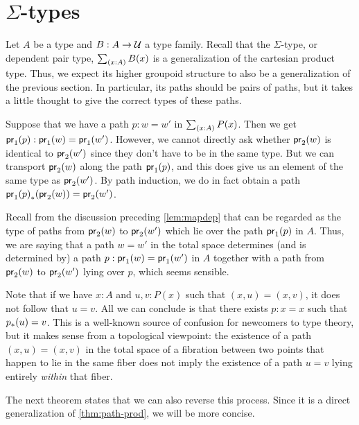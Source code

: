 %

\section{\texorpdfstring{$\Sigma$}{Σ}-types}
\label{sec:compute-sigma}

%
Let $A$ be a type and $B:A\to\mathcal{U}$ a type family.
Recall that the $\Sigma$-type, or dependent pair type, $\sm{x:A} B(x)$ is a generalization of the cartesian product type.
Thus, we expect its higher groupoid structure to also be a generalization of the previous section.
In particular, its paths should be pairs of paths, but it takes a little thought to give the correct types of these paths.

Suppose that we have a path $p:w=w'$ in $\sm{x:A}P(x)$.
Then we get ${\mathsf{pr}_{1}}\mathopen{}\left({p}\right)\mathclose{}:\mathsf{pr}_{1}(w)=\mathsf{pr}_{1}(w')$.
However, we cannot directly ask whether $\mathsf{pr}_{2}(w)$ is identical to $\mathsf{pr}_{2}(w')$ since they don't have to be in the same type.
But we can transport $\mathsf{pr}_{2}(w)$ along the path ${\mathsf{pr}_{1}}\mathopen{}\left({p}\right)\mathclose{}$, and this does give us an element of the same type as $\mathsf{pr}_{2}(w')$.
By path induction, we do in fact obtain a path ${{\mathsf{pr}_{1}}\mathopen{}\left({p}\right)\mathclose{}}_{*}\mathopen{}\left({\mathsf{pr}_{2}(w)}\right)\mathclose{}=\mathsf{pr}_{2}(w')$.

Recall from the discussion preceding \autoref{lem:mapdep} that
can be regarded as the type of paths from $\mathsf{pr}_{2}(w)$ to $\mathsf{pr}_{2}(w')$ which lie over the path ${\mathsf{pr}_{1}}\mathopen{}\left({p}\right)\mathclose{}$ in $A$.
%
%
Thus, we are saying that a path $w=w'$ in the total space determines (and is determined by) a path $p:\mathsf{pr}_{1}(w)=\mathsf{pr}_{1}(w')$ in $A$ together with a path from $\mathsf{pr}_{2}(w)$ to $\mathsf{pr}_{2}(w')$ lying over $p$, which seems sensible.

\begin{rmk}
  Note that if we have $x:A$ and $u,v:P(x)$ such that $(x,u)=(x,v)$, it does not follow that $u=v$.
  All we can conclude is that there exists $p:x=x$ such that ${p}_{*}\mathopen{}\left({u}\right)\mathclose{} = v$.
  This is a well-known source of confusion for newcomers to type theory, but it makes sense from a topological viewpoint: the existence of a path $(x,u)=(x,v)$ in the total space of a fibration between two points that happen to lie in the same fiber does not imply the existence of a path $u=v$ lying entirely \emph{within} that fiber.
\end{rmk}

The next theorem states that we can also reverse this process.
Since it is a direct generalization of \autoref{thm:path-prod}, we will be more concise.

